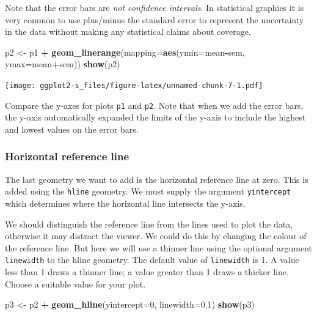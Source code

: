 \documentclass[
]{book}
\newenvironment{Shaded}{\begin{snugshade}}{\end{snugshade}}
\newcommand{\AttributeTok}[1]{\textcolor[rgb]{0.13,0.29,0.53}{#1}}
\newcommand{\DecValTok}[1]{\textcolor[rgb]{0.00,0.00,0.81}{#1}}
\newcommand{\FloatTok}[1]{\textcolor[rgb]{0.00,0.00,0.81}{#1}}
\newcommand{\FunctionTok}[1]{\textcolor[rgb]{0.13,0.29,0.53}{\textbf{#1}}}
\newcommand{\NormalTok}[1]{#1}
\newcommand{\OtherTok}[1]{\textcolor[rgb]{0.56,0.35,0.01}{#1}}
\newcommand{\SpecialCharTok}[1]{\textcolor[rgb]{0.81,0.36,0.00}{\textbf{#1}}}
\begin{document}
Note that the error bars are \emph{not confidence intervals}. In statistical graphics it is very common to use plus/minus the standard error to represent the uncertainty in the data without making any statistical claims about coverage.

\begin{Shaded}
\begin{Highlighting}[]
\NormalTok{p2 }\OtherTok{\textless{}{-}}\NormalTok{ p1 }\SpecialCharTok{+} \FunctionTok{geom\_linerange}\NormalTok{(}\AttributeTok{mapping=}\FunctionTok{aes}\NormalTok{(}\AttributeTok{ymin=}\NormalTok{mean}\SpecialCharTok{{-}}\NormalTok{sem, }\AttributeTok{ymax=}\NormalTok{mean}\SpecialCharTok{+}\NormalTok{sem))}
\FunctionTok{show}\NormalTok{(p2)}
\end{Highlighting}
\end{Shaded}

\texttt{[image: ggplot2-s\_files/figure-latex/unnamed-chunk-7-1.pdf]}

Compare the y-axes for plots \texttt{p1} and \texttt{p2}. Note that when we add the error bars, the y-axis automatically expanded the limits of the y-axis to include the highest and lowest values on the error bars.

\subsubsection{Horizontal reference line}\label{horizontal-reference-line}

The last geometry we want to add is the horizontal reference line at zero. This is added using the \texttt{hline} geometry. We must supply the argument \texttt{yintercept} which determines where the horizontal line intersects the y-axis.

We should distinguish the reference line from the lines used to plot the data, otherwise it may distract the viewer. We could do this by changing the colour of the reference line. But here we will use a thinner line using the optional argument \texttt{linewidth} to the hline geometry. The default value of \texttt{linewidth} is 1. A value less than 1 draws a thinner line; a value greater than 1 draws a thicker line. Choose a suitable value for your plot.

\begin{Shaded}
\begin{Highlighting}[]
\NormalTok{p3 }\OtherTok{\textless{}{-}}\NormalTok{ p2 }\SpecialCharTok{+} \FunctionTok{geom\_hline}\NormalTok{(}\AttributeTok{yintercept=}\DecValTok{0}\NormalTok{, }\AttributeTok{linewidth=}\FloatTok{0.1}\NormalTok{)}
\FunctionTok{show}\NormalTok{(p3)}
\end{Highlighting}
\end{Shaded}
\end{document}
